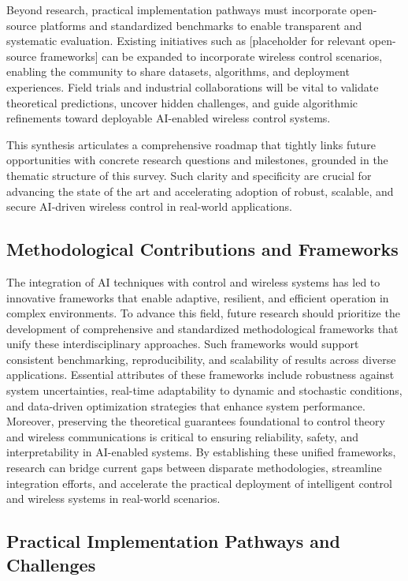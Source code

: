 \documentclass[sigconf]{acmart}
\begin{document}
Beyond research, practical implementation pathways must incorporate open-source platforms and standardized benchmarks to enable transparent and systematic evaluation. Existing initiatives such as [placeholder for relevant open-source frameworks] can be expanded to incorporate wireless control scenarios, enabling the community to share datasets, algorithms, and deployment experiences. Field trials and industrial collaborations will be vital to validate theoretical predictions, uncover hidden challenges, and guide algorithmic refinements toward deployable AI-enabled wireless control systems.

This synthesis articulates a comprehensive roadmap that tightly links future opportunities with concrete research questions and milestones, grounded in the thematic structure of this survey. Such clarity and specificity are crucial for advancing the state of the art and accelerating adoption of robust, scalable, and secure AI-driven wireless control in real-world applications.

\subsection{Methodological Contributions and Frameworks}

The integration of AI techniques with control and wireless systems has led to innovative frameworks that enable adaptive, resilient, and efficient operation in complex environments. To advance this field, future research should prioritize the development of comprehensive and standardized methodological frameworks that unify these interdisciplinary approaches. Such frameworks would support consistent benchmarking, reproducibility, and scalability of results across diverse applications. Essential attributes of these frameworks include robustness against system uncertainties, real-time adaptability to dynamic and stochastic conditions, and data-driven optimization strategies that enhance system performance. Moreover, preserving the theoretical guarantees foundational to control theory and wireless communications is critical to ensuring reliability, safety, and interpretability in AI-enabled systems. By establishing these unified frameworks, research can bridge current gaps between disparate methodologies, streamline integration efforts, and accelerate the practical deployment of intelligent control and wireless systems in real-world scenarios.

\subsection{Practical Implementation Pathways and Challenges}
\end{document}

